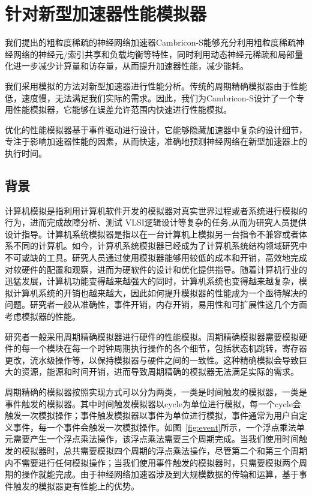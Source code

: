 \chapter{针对新型加速器性能模拟器}

我们提出的粗粒度稀疏的神经网络加速器Cambricon-S能够充分利用粗粒度稀疏神经网络的神经元/索引共享和负载均衡等特性，同时利用动态神经元稀疏和局部量化进一步减少计算量和访存量，从而提升加速器性能，减少能耗。

我们采用模拟的方法对新型加速器进行性能分析。传统的周期精确模拟器由于性能低，速度慢，无法满足我们实际的需求。因此，我们为Cambricon-S设计了一个专用性能模拟器，它能够在误差允许范围内快速进行性能模拟。

优化的性能模拟器基于事件驱动进行设计，它能够隐藏加速器中复杂的设计细节，专注于影响加速器性能的因素，从而快速，准确地预测神经网络在新型加速器上的执行时间。

\section{背景}
计算机模拟是指利用计算机软件开发的模拟器对真实世界过程或者系统进行模拟的行为，进而完成故障分析、测试 VLSI逻辑设计等复杂的任务,从而为研究人员提供设计指导。计算机系统模拟器是指以在一台计算机上模拟另一台指令不兼容或者体系不同的计算机。如今，计算机系统模拟器已经成为了计算机系统结构领域研究中不可或缺的工具。研究人员通过使用模拟器能够用较低的成本和开销，高效地完成对软硬件的配置和观察，进而为硬软件的设计和优化提供指导。随着计算机行业的迅猛发展，计算机功能变得越来越强大的同时，计算机系统也变得越来越复杂，模拟计算机系统的开销也越来越大，因此如何提升模拟器的性能成为一个亟待解决的问题。研究者一般从准确性，事件开销，内存开销，易用性和可扩展性这几个方面考虑模拟器的性能。

研究者一般采用周期精确模拟器进行硬件的性能模拟。周期精确模拟器需要模拟硬件的每一个模块在每一个时钟周期执行操作的各个细节，包括状态机跳转，寄存器更改，流水级操作等，以保持模拟器与硬件之间的一致性。这种精确模拟会导致巨大的资源，能源和时间开销，进而导致周期精确的模拟器无法满足实际的需求。

周期精确的模拟器按照实现方式可以分为两类，一类是时间触发的模拟器，一类是事件触发的模拟器。其中时间触发模拟器以cycle为单位进行模拟，每一个cycle会触发一次模拟操作；事件触发模拟器以事件为单位进行模拟，事件通常为用户自定义事件，每一个事件会触发一次模拟操作。如图~\ref{fig:event}所示，一个浮点乘法单元需要产生一个浮点乘法操作，该浮点乘法需要三个周期完成。当我们使用时间触发的模拟器时，总共需要模拟四个周期的浮点乘法操作，尽管第二个和第三个周期内不需要进行任何模拟操作；当我们使用事件触发的模拟器时，只需要模拟两个周期的操作就能完成。由于神经网络加速器涉及到大规模数据的传输和运算，基于事件触发的模拟器更有性能上的优势。

